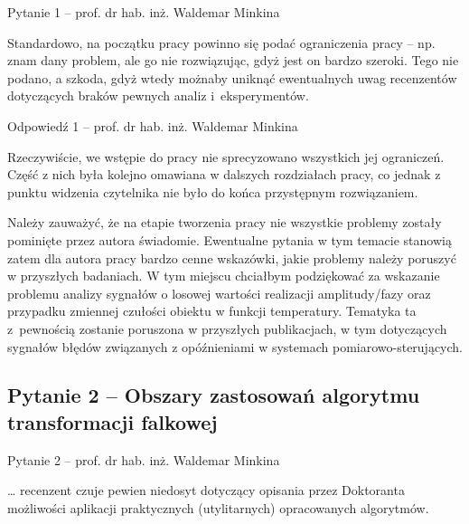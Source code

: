 \documentclass[12pt, polish, aspectratio = 169]{slides}
\begin{document}
\begin{frame}{Pytanie 1 -- prof. dr hab. inż. Waldemar Minkina}\large
\begin{justify}
Standardowo, na początku pracy powinno się podać ograniczenia pracy -- np. znam dany problem, ale go nie rozwiązując, gdyż jest on bardzo szeroki. Tego nie podano, a szkoda, gdyż wtedy możnaby uniknąć ewentualnych uwag recenzentów dotyczących braków pewnych analiz i eksperymentów.
\end{justify}
\end{frame}

\begin{frame}[allowframebreaks]{Odpowiedź 1 -- prof. dr hab. inż. Waldemar Minkina}\small
\begin{justify}
Rzeczywiście, we wstępie do pracy nie sprecyzowano wszystkich jej ograniczeń. Część z nich była kolejno omawiana w dalszych rozdziałach pracy, co jednak z punktu widzenia czytelnika nie było do końca przystępnym rozwiązaniem.

Należy zauważyć, że na etapie tworzenia pracy nie wszystkie problemy zostały pominięte przez autora świadomie. Ewentualne pytania w tym temacie stanowią zatem dla autora pracy bardzo cenne wskazówki, jakie problemy należy poruszyć w przyszłych badaniach. W tym miejscu chciałbym podziękować za wskazanie problemu analizy sygnałów o losowej wartości realizacji amplitudy/fazy oraz przypadku zmiennej czułości obiektu w funkcji temperatury. Tematyka ta z pewnością zostanie poruszona w przyszłych publikacjach, w tym dotyczących sygnałów błędów związanych z opóźnieniami w systemach pomiarowo-sterujących.
\end{justify}
\end{frame}

\subsection{Pytanie 2 -- Obszary zastosowań algorytmu transformacji falkowej}

\begin{frame}{Pytanie 2 -- prof. dr hab. inż. Waldemar Minkina}\large
\begin{justify}
\dots{} recenzent czuje pewien niedosyt dotyczący opisania przez Doktoranta możliwości aplikacji praktycznych (utylitarnych) opracowanych algorytmów.
\end{justify}
\end{frame}
\end{document}
